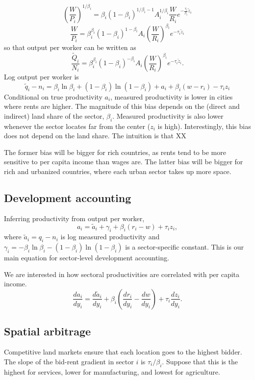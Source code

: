 \documentclass[12pt]{article}
\begin{document}
\[
\left(\frac{W}{P_i}\right)^{1/\beta_i}  =\beta_i(1-\beta_i)^{1/\beta_i-1}
A_i^{1/\beta_i}
\frac{W}{R_i}
 e^{-\frac{\tau_i}{\beta_i} \tilde z_i}
\]
\[
\frac{W}{P_i}  =\beta_i^{\beta_i}(1-\beta_i)^{1-\beta_i}
A_i
\left(\frac{W}{R_i}\right)^{\beta_i}
 e^{-\tau_i \tilde z_i}
\]
so that output per worker can be written as
\[
\frac{\tilde Q_i}{N_i} = \beta_i^{\beta_i}(1-\beta_i)^{-\beta_i}
A_i
\left(\frac{W}{R_i}\right)^{\beta_i}e^{-\tau_i \tilde z_i}.
 \]
Log output per worker is
\[
\tilde q_i - n_i =
\beta_i\ln\beta_i+(1-\beta_i)\ln(1-\beta_i)
+a_i +\beta_i (w
-r_i)
- \tau_{i}z_{i}
\]
Conditional on true productivity $a_i$, measured productivity is lower in cities where rents are higher. The magnitude of this bias depends on the (direct and indirect) land share of the sector, $\beta_i$. Measured productivity is also lower whenever the sector locates far from the center ($z_i$ is high). Interestingly, this bias does not depend on the land share. The intuition is that XX

The former bias will be bigger for rich countries, as rents tend to be more sensitive to per capita income than wages are. The latter bias will be bigger for rich and urbanized countries, where each urban sector takes up more space.

\subsection{Development accounting}

Inferring productivity from output per worker,
\[
a_i =  \tilde a_i +\gamma_i
+\beta_i (r_i-w)
+ \tau_{i}z_{i},
\]
where $\tilde a_i = q_i-n_i$ is log measured productivity and $\gamma_i = -\beta_i\ln\beta_i-(1-\beta_i)\ln(1-\beta_i)$ is a sector-specific constant. This is our main equation for sector-level development accounting.

We are interested in how sectoral productivities are correlated with per capita income.
\[
\frac{d a_i}{dy_i} = \frac{d \tilde a_i}{dy_i} +\beta_i \left(
\frac{d r_i}{dy_i}-\frac{d w}{dy_i}\right)
+ \tau_{i}\frac{d z_i}{dy_i}.
\]


\subsection{Spatial arbitrage}
Competitive land markets ensure that each location goes to the highest bidder. The slope of the bid-rent gradient in sector $i$ is $\tau_i/\beta_i$. Suppose that this is the highest for services, lower for manufacturing, and lowest for agriculture.
\end{document}
